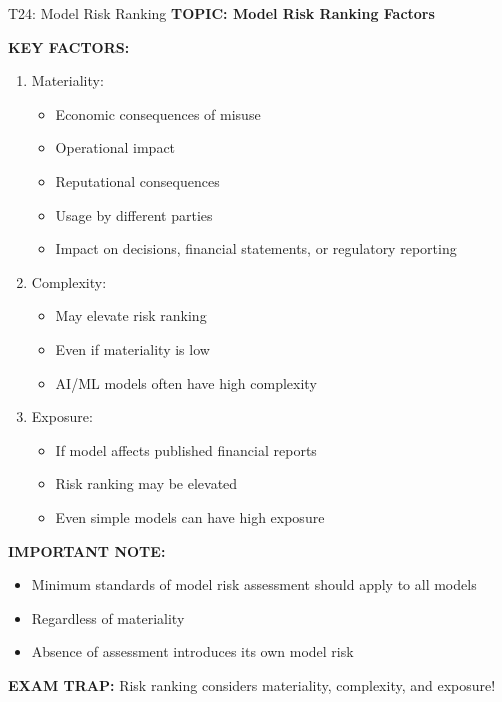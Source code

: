 \documentclass[8pt]{beamer}
\begin{document}
	\begin{frame}{T24: Model Risk Ranking}
		\fontsize{6.5}{7.5}\selectfont
		\textbf{TOPIC: Model Risk Ranking Factors}
		
		\vspace{0.1cm}
		\textbf{KEY FACTORS:}
		\begin{enumerate}
			\item \textcolor{myblue}{Materiality:}
			\begin{itemize}
				\item Economic consequences of misuse
				\item Operational impact
				\item Reputational consequences
				\item Usage by different parties
				\item Impact on decisions, financial statements, or regulatory reporting
			\end{itemize}
			\item \textcolor{myblue}{Complexity:}
			\begin{itemize}
				\item May elevate risk ranking
				\item Even if materiality is low
				\item AI/ML models often have high complexity
			\end{itemize}
			\item \textcolor{myblue}{Exposure:}
			\begin{itemize}
				\item If model affects published financial reports
				\item Risk ranking may be elevated
				\item Even simple models can have high exposure
			\end{itemize}
		\end{enumerate}
		
		\vspace{0.1cm}
		\textbf{IMPORTANT NOTE:}
		\begin{itemize}
			\item Minimum standards of model risk assessment should apply to all models
			\item Regardless of materiality
			\item Absence of assessment introduces its own model risk
		\end{itemize}
		
		\textcolor{myred}{\textbf{EXAM TRAP:}} Risk ranking considers \textcolor{myblue}{materiality, complexity, and exposure}!
	\end{frame}
	
\end{document}
